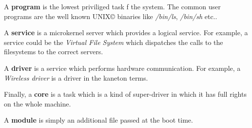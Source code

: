 A \textbf{program} is the lowest priviliged task f the system. The common
user programs are the well known UNIX{\copyright} binaries like
\textit{/bin/ls}, \textit{/bin/sh} etc..

A \textbf{service} is a microkernel server which provides a logical
service. For example, a service could be the \textit{Virtual File System}
which dispatches the calls to the filesystems to the correct servers.

A \textbf{driver} is a service which performs hardware communication.
For example, a \textit{Wireless driver} is a driver in the kaneton terms.

Finally, a \textbf{core} is a task which is a kind of super-driver in which
it has full rights on the whole machine.

A \textbf{module} is simply an additional file passed at the boot time.

